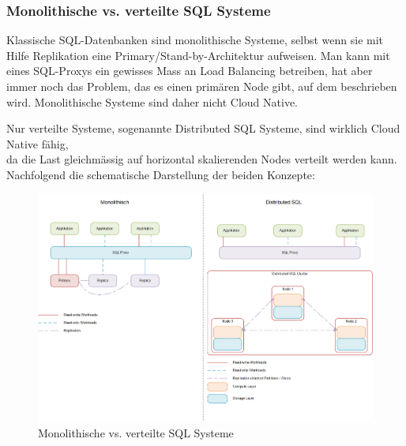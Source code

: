 
\clearpage
\subsubsection{Monolithische vs. verteilte SQL Systeme}
\begin{flushleft}
    Klassische SQL-Datenbanken sind monolithische Systeme, selbst wenn sie mit Hilfe Replikation eine Primary/Stand-by-Architektur aufweisen.
    Man kann mit eines SQL-Proxys ein gewisses Mass an Load Balancing betreiben, hat aber immer noch das Problem, das es einen primären Node gibt, auf dem beschrieben wird.
    Monolithische Systeme sind daher nicht Cloud Native.
\end{flushleft}
\begin{flushleft}
    Nur verteilte Systeme, sogenannte Distributed SQL Systeme, sind wirklich Cloud Native fähig,\\
    da die Last gleichmässig auf horizontal skalierenden Nodes verteilt werden kann.\\
    Nachfolgend die schematische Darstellung der beiden Konzepte:
    \begin{figure}[H]
        \centering
        \includegraphics[width=1\linewidth]{source/implementation/evaluation/excursus_architecture/monolith_distributed}
        \caption{Monolithische vs. verteilte SQL Systeme}
        \label{fig:Monolith_vs_Distributed_SQL}
    \end{figure}
\end{flushleft}
